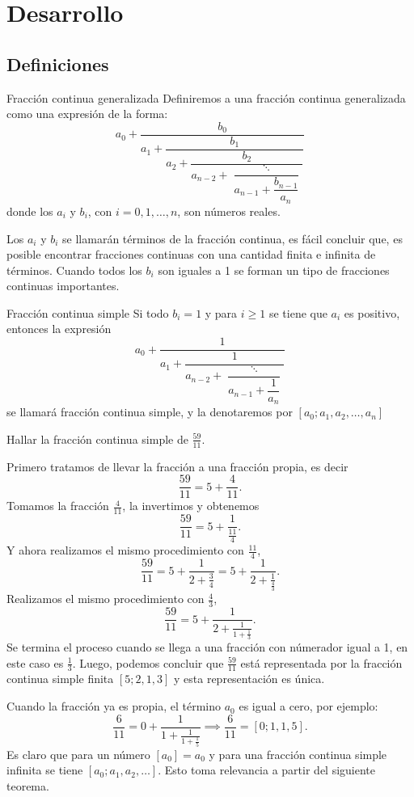 \section{Desarrollo}

\subsection{Definiciones}

\begin{definition.box}{Fracción continua generalizada}{}
    Definiremos a una fracción continua generalizada como una expresión de la forma:
    \[
        a_0 + \dfrac{b_0}{a_1 + \dfrac{b_1}{a_2 + \dfrac{b_2}{a_{n - 2} + \dfrac{\ddots}{a_{n - 1} + \dfrac{b_{n -1}}{a_n}}}}}
    \]
    donde los $a_i$ y $b_i$, con $i = 0,1, \ldots, n$, son números reales.
\end{definition.box}
Los $a_i$ y $b_i$ se llamarán términos de la fracción continua, es fácil concluir que, es posible encontrar fracciones continuas con una cantidad finita e infinita de términos.
Cuando todos los $b_i$ son iguales a 1 se forman un tipo de fracciones continuas importantes.

\begin{definition.box}{Fracción continua simple}{}
    Si todo $b_i = 1$ y para $i \geq 1$ se tiene que $a_i$ es positivo, entonces la expresión
    \[
        a_0 + \dfrac{1}{a_1 + \dfrac{1}{a_{n - 2} + \dfrac{\ddots}{a_{n - 1} + \dfrac{1}{a_n}}}}
    \]
    se llamará fracción continua simple, y la denotaremos por $[a_0; a_1, a_2, \ldots, a_n]$
\end{definition.box}

\begin{example}
    Hallar la fracción continua simple de $\frac{59}{11}$.
\end{example}
\begin{solution}
    Primero tratamos de llevar la fracción a una fracción propia, es decir
    \[
        \frac{59}{11} = 5 + \frac{4}{11}.
    \]
    Tomamos la fracción $\frac{4}{11}$, la invertimos y obtenemos
    \[
        \frac{59}{11} = 5 + \frac{1}{\frac{11}{4}}.
    \]
    Y ahora realizamos el mismo procedimiento con $\frac{11}{4}$,
    \[
        \frac{59}{11} = 5 + \frac{1}{2 + \frac{3}{4}} = 5 + \frac{1}{2 + \frac{1}{\frac{4}{3}}}.
    \]
    Realizamos el mismo procedimiento con $\frac{4}{3}$,
    \[
        \frac{59}{11} = 5 + \frac{1}{2 + \frac{1}{1 + \frac{1}{3}}}.
    \]
    Se termina el proceso cuando se llega a una fracción con númerador igual a 1, en este caso es $\frac{1}{3}$.
    Luego, podemos concluir que $\frac{59}{11}$ está representada por la fracción continua simple finita $[5; 2, 1, 3]$ y esta representación es única.
\end{solution}
Cuando la fracción ya es propia, el término $a_0$ es igual a cero, por ejemplo:
\[
    \frac{6}{11} = 0 + \frac{1}{1 + \frac{1}{1 + \frac{1}{5}}} \implies \frac{6}{11} = [0; 1,1,5].
\]
Es claro que para un número $[a_0] = a_0$ y para una fracción continua simple infinita se tiene $[a_0; a_1, a_2, \ldots]$.
Esto toma relevancia a partir del siguiente teorema.


